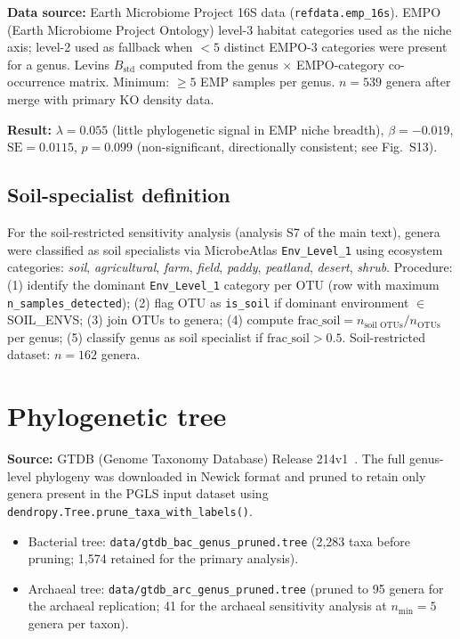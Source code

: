 \documentclass[11pt]{article}
\begin{document}
\textbf{Data source:} Earth Microbiome Project 16S data
(\texttt{refdata.emp\_16s}).  EMPO (Earth Microbiome Project Ontology)
level-3 habitat categories used as the niche axis; level-2 used as fallback
when $<5$ distinct EMPO-3 categories were present for a genus.  Levins
$B_\mathrm{std}$ computed from the genus $\times$ EMPO-category co-occurrence
matrix.  Minimum: $\geq 5$ EMP samples per genus.  $n = 539$ genera after
merge with primary KO density data.

\textbf{Result:} $\lambda = 0.055$ (little phylogenetic signal in EMP niche
breadth), $\beta = -0.019$, $\text{SE} = 0.0115$, $p = 0.099$ (non-significant,
directionally consistent; see Fig.~S13).

\subsection{Soil-specialist definition}

For the soil-restricted sensitivity analysis (analysis S7 of the main text),
genera were classified as soil specialists via MicrobeAtlas \texttt{Env\_Level\_1}
using ecosystem categories: \textit{soil}, \textit{agricultural}, \textit{farm},
\textit{field}, \textit{paddy}, \textit{peatland}, \textit{desert}, \textit{shrub}.
Procedure: (1) identify the dominant \texttt{Env\_Level\_1} category per OTU
(row with maximum \texttt{n\_samples\_detected}); (2) flag OTU as
\texttt{is\_soil} if dominant environment $\in$ SOIL\_ENVS; (3) join OTUs to
genera; (4) compute $\text{frac\_soil} = n_\text{soil OTUs} / n_\text{OTUs}$
per genus; (5) classify genus as soil specialist if $\text{frac\_soil} > 0.5$.
Soil-restricted dataset: $n = 162$ genera.

\section{Phylogenetic tree}
\label{sm:tree}

\textbf{Source:} GTDB (Genome Taxonomy Database) Release 214v1~\cite{parks2022}.  The full
genus-level phylogeny was downloaded in Newick format and pruned to retain only
genera present in the PGLS input dataset using
\texttt{dendropy.Tree.prune\_taxa\_with\_labels()}.

\begin{itemize}
\item Bacterial tree: \texttt{data/gtdb\_bac\_genus\_pruned.tree}
  (2,283 taxa before pruning; 1,574 retained for the primary analysis).

\item Archaeal tree: \texttt{data/gtdb\_arc\_genus\_pruned.tree}
  (pruned to 95 genera for the archaeal replication; 41 for the archaeal
  sensitivity analysis at $n_\text{min} = 5$ genera per taxon).
\end{itemize}
\end{document}
